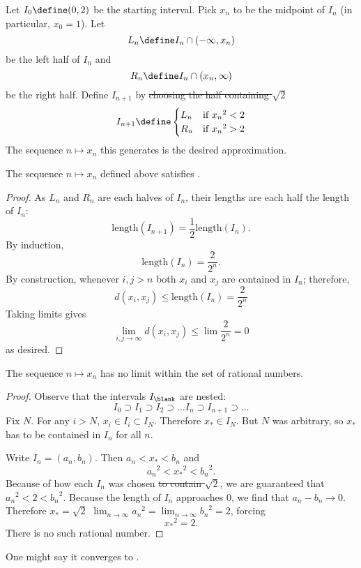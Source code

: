\documentclass{scrartcl}
\newcommand{\dist}{d}
\begin{document}
\begin{defn}

  Let \(I_{0}\define(0,2)\) be the starting interval. Pick \(x_{n}\) to be the midpoint of \(I_{n}\) (in particular, \(x_{0}=1\)). Let \[L_{n}\define I_{n}\cap (-\infty,x_{n})\] be the left half of \(I_{n}\) and
  \[R_{n}\define I_{n}\cap (x_{n},\infty)\] be the right half.
  Define \(I_{{n+1}}\) by \sout{choosing the half containing \(\sqrt 2\)}
  \[
    I_{{n+1}} \define
    \begin{cases}
      L_{n}& \textrm{if } {x_{n}}^{2} < 2 \\
      R_{n}& \textrm{if } {x_{n}}^{2} > 2
    \end{cases}
  \]
  The sequence \(n \mapsto x_{n}\) this generates is the desired approximation.
\end{defn}
\begin{theorem}
  The sequence \(n\mapsto x_{n}\) defined above satisfies .
\end{theorem}
\begin{proof}
  As \(L_{n}\) and \(R_{n}\) are each halves of \(I_{n}\), their lengths are each half the length of \(I_{n}\):
  \[
    \textrm{length}(I_{n+1}) = \frac 1 2 \textrm{length}(I_{n}).
  \]
  By induction, \[
    \textrm{length}(I_{n}) = \frac{2}{2^{n}}.
  \]
  By construction, whenever \(i,j > n\) both \(x_{i}\) and \(x_{j}\) are contained in \(I_{n}\); therefore,
  \[
    \dist(x_{i},x_{j}) \leq \textrm{length}(I_{n}) = \frac{2}{2^{n}}
  \]
  Taking limits gives
  \[
    \lim_{{i,j}\to\infty} \dist(x_{i},x_{j}) \leq \lim \frac{2}{2^{n}} = 0
  \]
  as desired.
\end{proof}

\begin{theorem}
  The sequence \(n\mapsto x_{n}\) has no limit within the set of rational numbers.
\end{theorem}
\begin{proof}
  Observe that the intervals \(I_{\blank}\) are nested:
  \[
    I_{0} \supset I_{1} \supset I_{2} \supset \dots I_{n} \supset I_{n+1} \supset \dots
  \]
  Fix \(N\). For any \(i> N\), \(x_{i}\in I_{i} \subset I_{N}\). Therefore \(x_{*}\in I_{N}\). But \(N\) was arbitrary, so \(x_{*}\) has to be contained in \(I_{n}\) for all \(n\).

  Write \(I_{n} = (a_{n},b_{n})\). Then \(a_{n}< x_{*} < b_{n}\) and
  \[{a_{n}}^{2} < {x_{*}}^{2} < {b_{n}}^{2}.\]
  Because of how each \(I_{n}\) was chosen \sout{to contain \(\sqrt 2\)}, we are guaranteed that \({a_{n}}^{2}< 2 < {b_{n}}^{2}\). Because the length of \(I_{n}\) approaches \(0\), we find that \(a_{n}-b_{n}\to 0\). Therefore \sout{\(x_{*}=\sqrt 2\)} \(\lim_{{n\to\infty}} {a_{n}}^{2}=\lim_{{n\to\infty}}{b_{n}}^{2} = 2\), forcing
  \[
    {x_{*}}^{2} = 2.
  \]
  There is no such rational number.
\end{proof}
One might say it converges to \colorbox{darkgray}{}.
\end{document}
